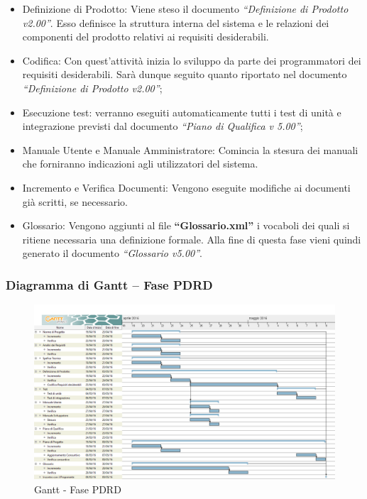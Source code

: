 \documentclass[../PianoProgetto.tex]{subfiles}
\begin{document}
		\begin{itemize}
			\item Definizione di Prodotto: Viene steso il documento \textit{“Definizione di Prodotto v2.00”}. Esso definisce la struttura interna del sistema e le relazioni dei componenti del prodotto relativi ai requisiti desiderabili.

			\item Codifica: Con quest’attività inizia lo sviluppo da parte dei programmatori dei requisiti desiderabili. Sarà dunque seguito quanto riportato nel documento \textit{“Definizione di Prodotto v2.00”};

	 		\item Esecuzione test: verranno eseguiti automaticamente tutti i test di unità e integrazione previsti dal documento \textit{“Piano di Qualifica v 5.00”};

			\item Manuale Utente e Manuale Amministratore: Comincia la stesura dei manuali che forniranno indicazioni agli utilizzatori del sistema.

			\item Incremento e Verifica Documenti: Vengono eseguite modifiche ai documenti già scritti, se necessario.

			\item Glossario: Vengono aggiunti al file \textbf{“Glossario.xml”} i vocaboli dei quali si ritiene necessaria una definizione formale. Alla fine di questa fase vieni quindi generato il documento \textit{“Glossario v5.00”}.
		\end{itemize}
		
		\subsubsection{Diagramma di Gantt – Fase PDRD}
			\begin{figure}[!h]
				\centering
				\includegraphics[width=\textwidth]{gantt_png/5-requisiti_desiderabili}
				\caption{Gantt - Fase PDRD}
				\label{fig:Gantt - Fase PDRD}
			\end{figure}
			
\end{document}
